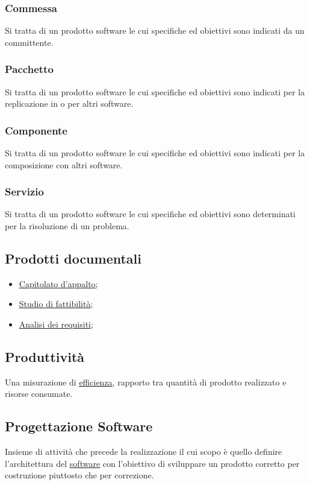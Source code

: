 		
		\subsubsection{Commessa}
		Si tratta di un prodotto software le cui specifiche ed obiettivi sono indicati da un committente.

		
		\subsubsection{Pacchetto}
		Si tratta di un prodotto software le cui specifiche ed obiettivi sono indicati per la replicazione in o per altri software.

		
		\subsubsection{Componente}
		Si tratta di un prodotto software le cui specifiche ed obiettivi sono indicati per la composizione con altri software.

		
		\subsubsection{Servizio}
		Si tratta di un prodotto software le cui specifiche ed obiettivi sono determinati per la risoluzione di un problema.


	\subsection{Prodotti documentali}
	\label{sec:prodottidocumentali}
	\begin{itemize}
	\item \underline{\hyperref[sec:capitolato]{Capitolato d'appalto};}
	\item \underline{\hyperref[sec:studiofattibilita]{Studio di fattibilità}};
	\item \underline{\hyperref[sec:analisirequisiti]{Analisi dei requisiti}};
	\end{itemize}


	\subsection{Produttività}
	\label{sec:produttivita}
	Una misurazione di \underline{\hyperref[sec:efficienza]{efficienza}}, rapporto tra quantità di prodotto realizzato e risorse consumate.


	\subsection{Progettazione Software}
	\label{sec:progettazionesoftware}
	Insieme di attività che precede la realizzazione il cui scopo è quello definire l'architettura del \underline{\hyperref[sec:prodottosoftware]{software}} con l'obiettivo di sviluppare un prodotto corretto per costruzione piuttosto che per correzione.


